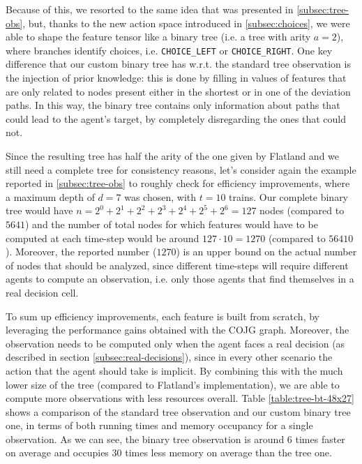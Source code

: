 \documentclass[a4paper,10pt]{report}
\begin{document}
Because of this, we resorted to the same idea that was presented in \ref{subsec:tree-obs}, but, thanks to the new action space introduced in \ref{subsec:choices}, we were able to shape the feature tensor like a binary tree (i.e. a tree with arity $a=2$), where branches identify choices, i.e. \texttt{CHOICE_LEFT} or \texttt{CHOICE_RIGHT}. One key difference that our custom binary tree has w.r.t. the standard tree observation is the injection of prior knowledge: this is done by filling in values of features that are only related to nodes present either in the shortest or in one of the deviation paths. In this way, the binary tree contains only information about paths that could lead to the agent's target, by completely disregarding the ones that could not. 

Since the resulting tree has half the arity of the one given by Flatland and we still need a complete tree for consistency reasons, let's consider again the example reported in \ref{subsec:tree-obs} to roughly check for efficiency improvements, where a maximum depth of $d=7$ was chosen, with $t=10$ trains. Our complete binary tree would have $n=2^0+2^1+2^2+2^3+2^4+2^5+2^6=\num{127}$ nodes (compared to $\num{5641}$) and the number of total nodes for which features would have to be computed at each time-step would be around $\num{127}\cdot 10=\num{1270}$ (compared to $\num{56410}$). Moreover, the reported number ($\num{1270}$) is an upper bound on the actual number of nodes that should be analyzed, since different time-steps will require different agents to compute an observation, i.e. only those agents that find themselves in a real decision cell.

To sum up efficiency improvements, each feature is built from scratch, by leveraging the performance gains obtained with the COJG graph. Moreover, the observation needs to be computed only when the agent faces a real decision (as described in section \ref{subsec:real-decisions}), since in every other scenario the action that the agent should take is implicit. By combining this with the much lower size of the tree (compared to Flatland's implementation), we are able to compute more observations with less resources overall. Table \ref{table:tree-bt-48x27} shows a comparison of the standard tree observation and our custom binary tree one, in terms of both running times and memory occupancy for a single observation. As we can see, the binary tree observation is around $6$ times faster on average and occupies $30$ times less memory on average than the tree one.
\end{document}

